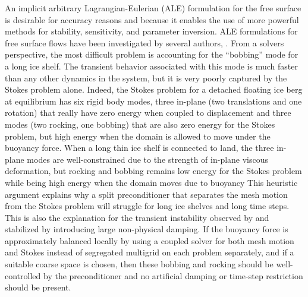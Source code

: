 An implicit arbitrary Lagrangian-Eulerian (ALE) formulation for the free surface is desirable for accuracy reasons and because it enables the use of more powerful methods for stability, sensitivity, and parameter inversion.
ALE formulations for free surface flows have been investigated by several authors, \citet[\eg]{braess2000arbitrary,walkley2004calculation,behr2004application,cairncross2000fem,baer2000fem}.
From a solvers perspective, the most difficult problem is accounting for the ``bobbing'' mode for a long ice shelf.
The transient behavior associated with this mode is much faster than any other dynamics in the system, but it is very poorly captured by the Stokes problem alone.
Indeed, the Stokes problem for a detached floating ice berg at equilibrium has six rigid body modes, three in-plane (two translations and one rotation) that really have zero energy when coupled to displacement and three modes (two rocking, one bobbing) that are also zero energy for the Stokes problem, but high energy when the domain is allowed to move under the buoyancy force.
When a long thin ice shelf is connected to land, the three in-plane modes are well-constrained due to the strength of in-plane viscous deformation, but rocking and bobbing remains low energy for the Stokes problem while being high energy when the domain moves due to buoyancy
This heuristic argument explains why a split preconditioner that separates the mesh motion from the Stokes problem will struggle for long ice shelves and long time steps.
This is also the explanation for the transient instability observed by \citet{durand2009marine} and stabilized by introducing large non-physical damping.
If the buoyancy force is approximately balanced locally by using a coupled solver for both mesh motion and Stokes instead of segregated multigrid on each problem separately, and if a suitable coarse space is chosen, then these bobbing and rocking should be well-controlled by the preconditioner and no artificial damping or time-step restriction should be present.

